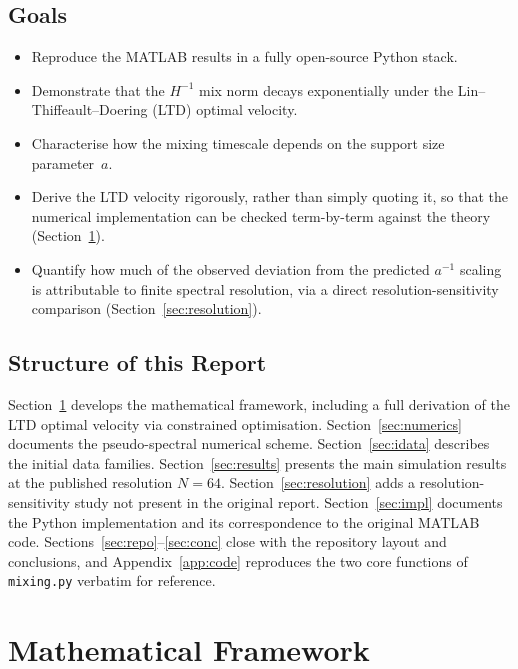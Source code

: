\documentclass[12pt,a4paper]{article}
\theoremstyle{definition}
\theoremstyle{plain}
\begin{document}
\subsection{Goals}
\begin{itemize}
  \item Reproduce the MATLAB results in a fully open-source Python stack.
  \item Demonstrate that the $H^{-1}$ mix norm decays exponentially under the
        Lin--Thiffeault--Doering (LTD) optimal velocity.
  \item Characterise how the mixing timescale depends on the support
        size parameter~$a$.
  \item Derive the LTD velocity rigorously, rather than simply quoting it,
        so that the numerical implementation can be checked term-by-term
        against the theory (Section~\ref{sec:math}).
  \item Quantify how much of the observed deviation from the predicted
        $a^{-1}$ scaling is attributable to finite spectral resolution,
        via a direct resolution-sensitivity comparison
        (Section~\ref{sec:resolution}).
\end{itemize}

\subsection{Structure of this Report}

Section~\ref{sec:math} develops the mathematical framework, including a
full derivation of the LTD optimal velocity via constrained optimisation.
Section~\ref{sec:numerics} documents the pseudo-spectral numerical scheme.
Section~\ref{sec:idata} describes the initial data families.
Section~\ref{sec:results} presents the main simulation results at the
published resolution $N=64$.
Section~\ref{sec:resolution} adds a resolution-sensitivity study not present
in the original report.
Section~\ref{sec:impl} documents the Python implementation and its
correspondence to the original MATLAB code.
Sections~\ref{sec:repo}--\ref{sec:conc} close with the repository layout and
conclusions, and Appendix~\ref{app:code} reproduces the two core functions
of \texttt{mixing.py} verbatim for reference.

\section{Mathematical Framework}
\label{sec:math}
\end{document}

